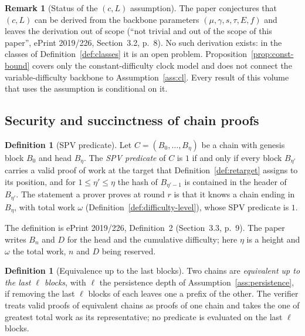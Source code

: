 \documentclass[11pt,a4paper]{article}
\theoremstyle{definition}
\newtheorem{definition}[theorem]{Definition}
\newtheorem{remark}[theorem]{Remark}
\begin{document}
\begin{remark}[Status of the $(c, L)$ assumption]\label{rem:cl-status}
The paper conjectures that $(c, L)$ can be derived from the backbone
parameters $(\mu, \gamma, s, \tau, E, f)$ and leaves the derivation out of
scope (``not trivial and out of the scope of this paper'', ePrint 2019/226,
Section~3.2, p.~8). No such derivation exists: in the classes of
Definition~\ref{def:classes} it is an open problem.
Proposition~\ref{prop:const-bound} covers only the constant-difficulty clock
model and does not connect the variable-difficulty backbone to
Assumption~\ref{ass:cl}. Every result of this volume that uses the
assumption is conditional on it.
\end{remark}

\subsection{Security and succinctness of chain proofs}\label{sec:model-defs}

\begin{definition}[SPV predicate]\label{def:spv-predicate}
Let $C = (B_0, \ldots, B_\eta)$ be a chain with genesis block $B_0$ and head
$B_\eta$. The \emph{SPV predicate} of $C$ is $1$ if and only if every block
$B_{\eta'}$ carries a valid proof of work at the target that
Definition~\ref{def:retarget} assigns to its position, and for
$1 \le \eta' \le \eta$ the hash of $B_{\eta'-1}$ is contained in the header
of $B_{\eta'}$.
The statement a prover proves at round $r$ is that it knows a chain ending
in $B_\eta$, with total work $\omega$ (Definition~\ref{def:difficulty-level}),
whose SPV predicate is $1$.
\end{definition}

The definition is ePrint 2019/226, Definition~2 (Section~3.3, p.~9). The
paper writes $B_n$ and $D$ for the head and the cumulative difficulty; here
$\eta$ is a height and $\omega$ the total work, $n$ and $D$ being reserved.

\begin{definition}[Equivalence up to the last blocks]\label{def:last-ell}
Two chains are \emph{equivalent up to the last $\ell$ blocks}, with $\ell$
the persistence depth of Assumption~\ref{ass:persistence}, if removing the
last $\ell$ blocks of each leaves one a prefix of the other. The verifier
treats valid proofs of equivalent chains as proofs of one chain and takes
the one of greatest total work as its representative; no predicate is
evaluated on the last $\ell$ blocks.
\end{definition}
\end{document}
